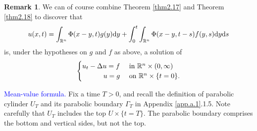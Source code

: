 \documentclass[hyperref,UTF8,12pt]{article}
\numberwithin{equation}{subsection}
\theoremstyle{plain}
\theoremstyle{definition}
\newtheorem{remark}{Remark}
\numberwithin{theorem}{section}
\numberwithin{lemma}{section}
\numberwithin{proposition}{section}
\numberwithin{remark}{section}
\numberwithin{corollary}{section}
\numberwithin{definition}{section}
\numberwithin{problem}{section}
\numberwithin{example}{section}
\def\dif{\textup{d}}
\newcommand{\mr}{\mathbb{R}}
\begin{document}
\begin{remark}
We can of course combine Theorem \ref{thm2.17} and Theorem \ref{thm2.18} to discover that \[u(x,t)=\int_{\mr^n}\Phi(x-y,t)g(y)\dif y+\int_0^t\int_{\mr^n}\Phi(x-y,t-s)f(y,s)\dif y\dif s\]is, under the hypotheses on $g$ and $f$ as above, a solution of\[\begin{cases}
	\hfill u_t-\Delta u=f&\text{ in } \mr^n\times(0,\infty)\\
	\hfill u=g&\text{ on } \mr^n\times\{t=0\}.
\end{cases}\]
\end{remark}

\noindent\textcolor{blue}{Mean-value formula.} Fix a time $T>0$, and recall the definition of parabolic cylinder $U_T$ and its parabolic boundary $\Gamma_T$ in Appendix \ref{app.a.1}.1.5. Note carefully that $U_T$ includes the top $U\times\{t=T\}$. The parabolic boundary comprises the bottom and vertical sides, but not the top.
\end{document}
